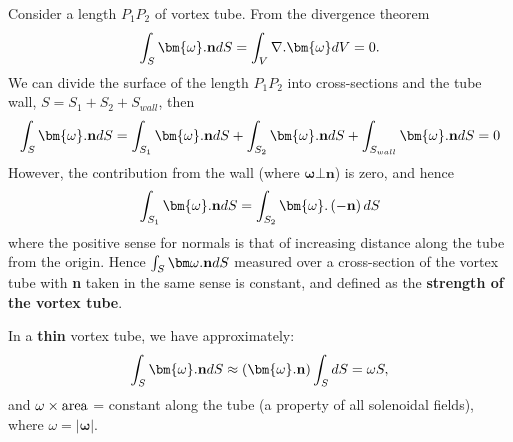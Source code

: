 \documentclass[10pt]{report}
\begin{document}
Consider a length $P_{1}P_{2}$ of vortex tube. From the divergence
theorem
\[
\int_S {{\bm{\omega}}. {{\bf n}}dS} =\int_V {\nabla . {\bm{\omega}} dV}
=0.
\]
We can divide the surface of the length $P_{1} P_{2}$ into cross-sections
and the tube wall, $S = S_{1} + S_{2} + S_{{wall}}$, then
\[
\int_S {{\bm{\omega}}. {{\bf n}}dS} =\int_{S_1 } {{\bm{\omega}}. {\rm
{\bf n}}dS} +\int_{S_2 } {{\bm{\omega}}. {{\bf n}}dS}
+\int_{S_{wall} } {{\bm{\omega}}. {{\bf n}}dS} =0
\]
However, the contribution from the wall (where ${\bm{\omega}}\bot
\textbf{n}$) is zero, and hence
\[
\int_{S_1 } {{\bm{\omega}}. {{\bf n}}dS} =\int_{S_2 } {{\bm{\omega}}.
\left( {-{{\bf n}}} \right)dS}
\]
where the positive sense for normals is that of increasing distance along
the tube from the origin. Hence $\int_{S} {{\bm\omega}. {{\bf
n}}dS} $ measured over a cross-section of the vortex tube with \textbf{n}
taken in the same sense is constant, and defined as the \textbf{strength of
the vortex tube}.

In a \textbf{thin} vortex tube, we have approximately:
\[
\int_S {{\bm{\omega}}. {{\bf n}}dS} \approx \left( {{\bm{\omega}}. {{\bf
n}}} \right)\int_S {dS} =\omega S,
\]
and $\omega \times \hbox{area}$ = constant along the tube (a property of all
solenoidal fields), where $\omega = | {\bm{\omega}}|$.
\end{document}
